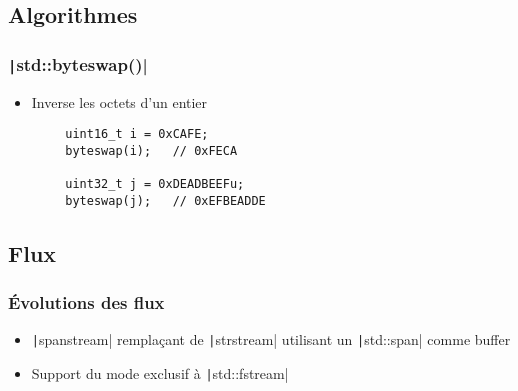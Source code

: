 \documentclass[C++.tex]{subfiles}
\begin{document}
\subsection*{Algorithmes}
\begin{frame}[fragile]
	\frametitle{\texttt|std::byteswap()|}
	\begin{itemize}
		\item Inverse les octets d'un entier
	\end{itemize}

	\begin{verbatim}
		uint16_t i = 0xCAFE;
		byteswap(i);   // 0xFECA

		uint32_t j = 0xDEADBEEFu;
		byteswap(j);   // 0xEFBEADDE
	\end{verbatim}


\end{frame}

\subsection*{Flux}
\begin{frame}[fragile]
	\frametitle{Évolutions des flux}
	\begin{itemize}
		\item \texttt|spanstream| remplaçant de \texttt|strstream| utilisant un \texttt|std::span| comme buffer
		\item Support du mode exclusif à \texttt|std::fstream|
	\end{itemize}

\end{frame}
\end{document}
